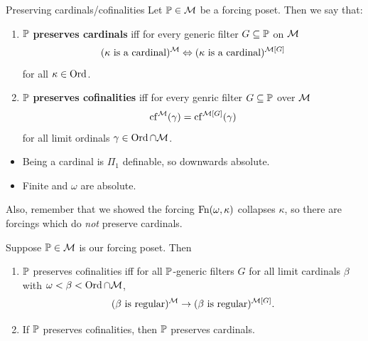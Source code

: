 \documentclass{article}
\begin{document}
    \newlec
    \begin{fancydefine}{Preserving cardinals/cofinalities}
        Let $\mathbb{P} \in \mathcal{M}$ be a forcing poset. Then we say that: \begin{enumerate}
            \item[(i)] $\mathbb{P}$ \textbf{preserves cardinals} iff for every generic filter $G \subseteq \mathbb{P}$ on $\mathcal{M}$ \[ (\text{$\kappa$ is a cardinal})^{\mathcal{M}} \Leftrightarrow (\text{$\kappa$ is a cardinal})^{\mathcal{M}[G]}\]
                  for all $\kappa \in \operatorname{Ord}$.
            \item[(ii)] $\mathbb{P}$ \textbf{preserves cofinalities} iff for every genric filter $G \subseteq \mathbb{P}$ over $\mathcal{M}$ \[ \operatorname{cf}^{\mathcal{M}}(\gamma)= \operatorname{cf}^{\mathcal{M}[G]}(\gamma)\] for all limit ordinals $\gamma \in \operatorname{Ord} \cap \mathcal{M}$.
        \end{enumerate}
    \end{fancydefine}
    \begin{remark*}\hspace{0.1cm}
        \begin{itemize}
            \item Being a cardinal is $\Pi_{1}$ definable, so downwards absolute.
            \item Finite and $\omega$ are absolute.
        \end{itemize}
        Also, remember that we showed the forcing $\operatorname{Fn}(\omega, \kappa)$ collapses $\kappa$, so there are forcings which do \textit{not} preserve cardinals.
    \end{remark*}
    \begin{fancylem}{}
        Suppose $\mathbb{P} \in \mathcal{M}$ is our forcing poset. Then \begin{enumerate}
            \item[(i)] $\mathbb{P}$ preserves cofinalities iff for all $\mathbb{P}$-generic filters $G$ for all limit cardinals $\beta$ with $\omega < \beta < \operatorname{Ord} \cap \mathcal{M}$, \[ (\text{$\beta$ is regular})^{\mathcal{M}} \rightarrow (\text{$\beta$ is regular})^{\mathcal{M}[G]}.\]
            \item[(ii)] If $\mathbb{P}$ preserves cofinalities, then $\mathbb{P}$ preserves cardinals.
        \end{enumerate}
    \end{fancylem}
    \proof \hspace{0.1cm}
\end{document}
